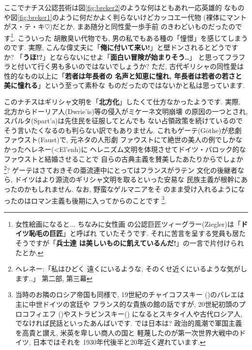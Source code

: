 \documentclass[b5j,8pt,twocolumn]{ltjsarticle}
\newcommand{\textgreek}[1]{\begingroup\fontencoding{LGR}\selectfont#1\endgroup}
\begin{document}
ここでナチス公認芸術は図\ref{fig:breker2}のような何はともあれ一応英雄的
なものや図\ref{fig:breker1}のように何だかよく判らないけどカッコエー代物
(裸体にマントがス・テ・キ$\heartsuit$)だとか, まあ随分と同性愛一歩手前
のきわどいものだったのです\footnote{女性絵画になると... ちなみに女性画
の公認巨匠ツィーグラー(Ziegler)は「\textbf{ドイツ恥毛の巨匠}」と呼ばれ
ていたそうです. それに苦言を呈する党員も居たそうですが「\textbf{兵士達
は美しいものに飢えているんだ!}」の一言で片付けられたとか.}. こういった
胡散臭い代物でも, 男の私でもある種の「憧憬」を感じてしまうのです. 実際,
 こんな偉丈夫に「\textbf{俺に付いて来い!}」と壁ドンされるとどうですか?
 「\textbf{うほ!?}」とならないにせよ「\textbf{面白い冒険が始まりそう..}」
と思ってフラフラと付いて行く男も多いのではないでしょうか?
 ただ, 古代ギリシャの同性愛は性的なもの以上に「\textbf{若者は年長者の
名声と知恵に憧れ, 年長者は若者の若さと美に憧れる}」という至って素朴な
ものだったのではないかと私は思っています.
\newline

このナチスはギリシャ文明を「\textbf{北方化}」したくて仕方なかったようです.
 実際, 北方からドーリア人(\textgreek{Dwrie'is})等の侵入がミケーネ文明崩壊
の原因の一つとされ, スパルタ(\textgreek{Spart'a})は先住民を征服してとんでも
ない占領政策を続けているのでそう言いたくなるのも判らない訳でもありません.
 これもゲーテ(G\"othe)が悲劇ファウスト(Faust)\cite{ゲーテ}で, 元ネタの人形劇
ファウストにて絶世の美人の例でしかなかったヘレネー(\textgreek{<El'enh})に
ヘレニズム文明を体現させてドイツ・バロック的なファウストと結婚させることで
自らの古典主義を賛美したあたりからでしょか\footnote{ヘレネー:「私はひどく
遠くにいるような, そのくせ近くにいるような気がします..」\cite{ゲーテ}
第二部, 第三幕}?  ゲーテはさておきその亜流連中にとってはフランスがラテン
文化の後継者なら, ドイツはより源流のギリシャ文明を取るといった安易な
民族主義が根幹にあったのかもしれません. なお, 野蛮なゲルマニアをそ
のまま受け入れるようになったのはロマン主義も後期に入ってからのことです
\footnote{当時のお隣のロシア帝国も同様で, 19世紀のチャイコフスキー
({})のバレエは主に中世ドイツの宮廷や
フランス的な貴族の館の話ですが, 20世紀初頭のプロコフィエフ
({})やストラビンスキー({})
になるとスキタイ人や古代ロシア人, でなければ民話といったあんばいです.
 では日本は? 政治的風潮で軍国主義を高貴と讃え, 米英を卑しい商人の国と
軽蔑したのが第一次世界大戦中のドイツ\cite{クラウス}, 日本ではそれを
1930年代後半と20年近く遅れています.}.
\newline
\end{document}
